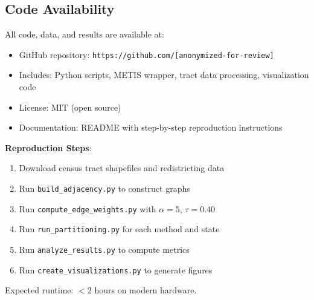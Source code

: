 \subsection{Code Availability}

All code, data, and results are available at:
\begin{itemize}
    \item GitHub repository: \texttt{https://github.com/[anonymized-for-review]}
    \item Includes: Python scripts, METIS wrapper, tract data processing, visualization code
    \item License: MIT (open source)
    \item Documentation: README with step-by-step reproduction instructions
\end{itemize}

\textbf{Reproduction Steps}:
\begin{enumerate}
    \item Download census tract shapefiles and redistricting data
    \item Run \texttt{build\_adjacency.py} to construct graphs
    \item Run \texttt{compute\_edge\_weights.py} with $\alpha=5$, $\tau=0.40$
    \item Run \texttt{run\_partitioning.py} for each method and state
    \item Run \texttt{analyze\_results.py} to compute metrics
    \item Run \texttt{create\_visualizations.py} to generate figures
\end{enumerate}

Expected runtime: $< 2$ hours on modern hardware.
